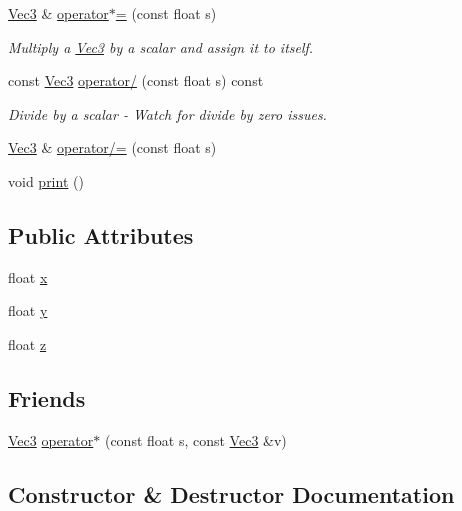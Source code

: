 \begin{DoxyCompactItemize}
\hyperlink{struct_ori_engine_1_1_vec3}{Vec3} \& \hyperlink{struct_ori_engine_1_1_vec3_a93473080cc10ee1c3554a9557d467215}{operator$\ast$=} (const float s)
\begin{DoxyCompactList}\small\item\em Multiply a \hyperlink{struct_ori_engine_1_1_vec3}{Vec3} by a scalar and assign it to itself. \end{DoxyCompactList}\item 
const \hyperlink{struct_ori_engine_1_1_vec3}{Vec3} \hyperlink{struct_ori_engine_1_1_vec3_ae3a5cf75e250a543b1045be44b954950}{operator/} (const float s) const
\begin{DoxyCompactList}\small\item\em Divide by a scalar -\/ Watch for divide by zero issues. \end{DoxyCompactList}\item 
\hyperlink{struct_ori_engine_1_1_vec3}{Vec3} \& \hyperlink{struct_ori_engine_1_1_vec3_a8931b41bd47e616624c49320bd83e959}{operator/=} (const float s)
\item 
void \hyperlink{struct_ori_engine_1_1_vec3_a87155de383da7584fbe0725b3a4e371d}{print} ()
\end{DoxyCompactItemize}
\subsection*{Public Attributes}
\begin{DoxyCompactItemize}
\item 
float \hyperlink{struct_ori_engine_1_1_vec3_a2682de13a3ac0391777172f7f0af4027}{x}
\item 
float \hyperlink{struct_ori_engine_1_1_vec3_af7815329fe7e5d909afea88c87ac9ff6}{y}
\item 
float \hyperlink{struct_ori_engine_1_1_vec3_a9d4a41bdb6ce600fa8a23d27752ba2d1}{z}
\end{DoxyCompactItemize}
\subsection*{Friends}
\begin{DoxyCompactItemize}
\item 
\hyperlink{struct_ori_engine_1_1_vec3}{Vec3} \hyperlink{struct_ori_engine_1_1_vec3_aadc3cbbff02e566f5b84a5cccc5e0fa0}{operator$\ast$} (const float s, const \hyperlink{struct_ori_engine_1_1_vec3}{Vec3} \&v)
\end{DoxyCompactItemize}


\subsection{Constructor \& Destructor Documentation}
\hypertarget{struct_ori_engine_1_1_vec3_a36bb2140a6a15310e08b4daaaf9a3909}{}\label{struct_ori_engine_1_1_vec3_a36bb2140a6a15310e08b4daaaf9a3909} 
